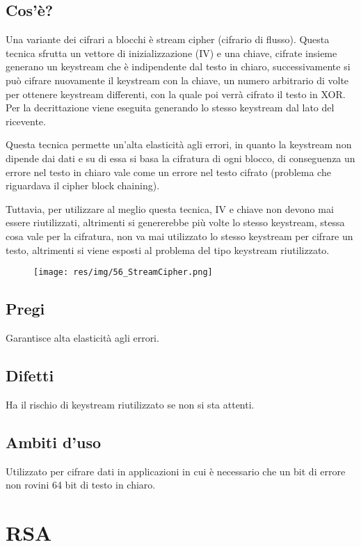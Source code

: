 \subsection{Cos'è?}
Una variante dei cifrari a blocchi è stream cipher (cifrario di flusso).
Questa tecnica sfrutta un vettore di inizializzazione (IV) e una chiave, cifrate insieme generano un keystream che è indipendente dal testo in chiaro, successivamente si può cifrare nuovamente il keystream con la chiave, un numero arbitrario di volte per ottenere keystream differenti, con la quale poi verrà cifrato il testo in XOR.
Per la decrittazione viene eseguita generando lo stesso keystream dal lato del ricevente.

Questa tecnica permette un'alta elasticità agli errori, in quanto la keystream non dipende dai dati e su di essa si basa la cifratura di ogni blocco, di conseguenza un errore nel testo in chiaro vale come un errore nel testo cifrato (problema che riguardava il cipher block chaining).

Tuttavia, per utilizzare al meglio questa tecnica, IV e chiave non devono mai essere riutilizzati, altrimenti si genererebbe più volte lo stesso keystream, stessa cosa vale per la cifratura, non va mai utilizzato lo stesso keystream per cifrare un testo, altrimenti si viene esposti al problema del tipo keystream riutilizzato.

\begin{figure}[H]
\centering
\texttt{[image: res/img/56\_StreamCipher.png]}
\end{figure} 

\subsection{Pregi}
Garantisce alta elasticità agli errori.
\subsection{Difetti}
Ha il rischio di keystream riutilizzato se non si sta attenti.
\subsection{Ambiti d'uso}
Utilizzato per cifrare dati in applicazioni in cui è necessario che un bit di errore non rovini 64 bit di testo in chiaro.

\section{RSA}
